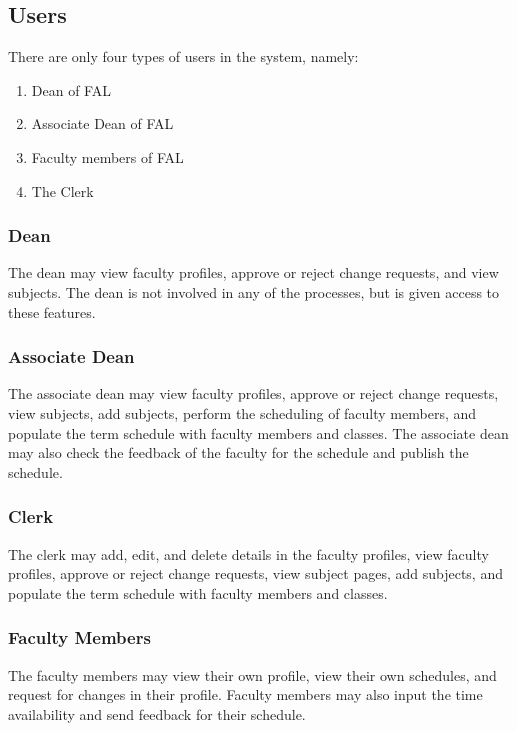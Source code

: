 \subsection{Users}
There are only four types of users in the system, namely:
\begin{enumerate}
\item Dean of FAL
\item Associate Dean of FAL
\item Faculty members of FAL
\item The Clerk
\end{enumerate}

\subsubsection{Dean}
The dean may view faculty profiles, approve or reject change requests, and view subjects. The dean is not involved in any of the processes, but is given access to these features.

\subsubsection{Associate Dean}
The associate dean may view faculty profiles, approve or reject change requests, view subjects, add subjects, perform the scheduling of faculty members, and populate the term schedule with faculty members and classes. The associate dean may also check the feedback of the faculty for the schedule and publish the schedule.

\subsubsection{Clerk}
The clerk may add, edit, and delete details in the faculty profiles, view faculty profiles, approve or reject change requests, view subject pages, add subjects, and populate the term schedule with faculty members and classes.

\subsubsection{Faculty Members}
The faculty members may view their own profile, view their own schedules, and request for changes in their profile. Faculty members may also input the time availability and send feedback for their schedule.


